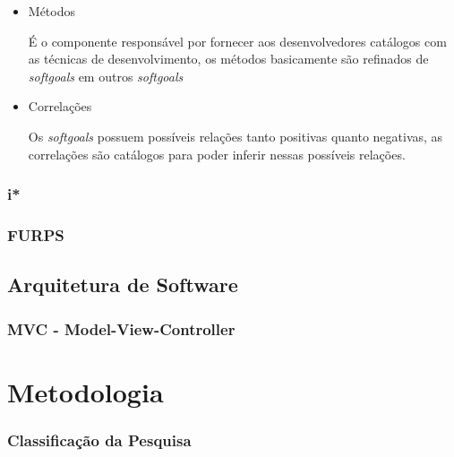\begin{itemize}
	\item Métodos
	
	É o componente responsável por fornecer aos desenvolvedores catálogos com as técnicas de desenvolvimento, os métodos basicamente são refinados de \textit{softgoals} em outros \textit{softgoals}
	
	\item Correlações
	
	Os \textit{softgoals} possuem possíveis relações tanto positivas quanto negativas, as correlações são catálogos para poder inferir nessas possíveis relações. 
\end{itemize}

\subsection{i*}

\subsection{FURPS}


\section{Arquitetura de Software}

\subsection{MVC - Model-View-Controller}

\chapter{Metodologia}

\subsection{Classificação da Pesquisa}